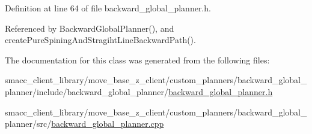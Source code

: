 Definition at line 64 of file backward\+\_\+global\+\_\+planner.\+h.



Referenced by Backward\+Global\+Planner(), and create\+Pure\+Spining\+And\+Stragiht\+Line\+Backward\+Path().



The documentation for this class was generated from the following files\+:\begin{DoxyCompactItemize}
\item 
smacc\+\_\+client\+\_\+library/move\+\_\+base\+\_\+z\+\_\+client/custom\+\_\+planners/backward\+\_\+global\+\_\+planner/include/backward\+\_\+global\+\_\+planner/\hyperlink{backward__global__planner_8h}{backward\+\_\+global\+\_\+planner.\+h}\item 
smacc\+\_\+client\+\_\+library/move\+\_\+base\+\_\+z\+\_\+client/custom\+\_\+planners/backward\+\_\+global\+\_\+planner/src/\hyperlink{backward__global__planner_8cpp}{backward\+\_\+global\+\_\+planner.\+cpp}\end{DoxyCompactItemize}
